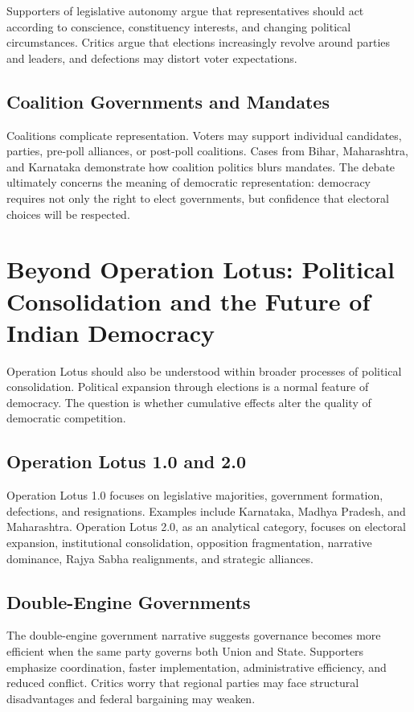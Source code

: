 \documentclass[11pt]{article}
\begin{document}
Supporters of legislative autonomy argue that representatives should act according to conscience, constituency interests, and changing political circumstances. Critics argue that elections increasingly revolve around parties and leaders, and defections may distort voter expectations.

\subsection{Coalition Governments and Mandates}
Coalitions complicate representation. Voters may support individual candidates, parties, pre-poll alliances, or post-poll coalitions. Cases from Bihar, Maharashtra, and Karnataka demonstrate how coalition politics blurs mandates. The debate ultimately concerns the meaning of democratic representation: democracy requires not only the right to elect governments, but confidence that electoral choices will be respected.

\section{Beyond Operation Lotus: Political Consolidation and the Future of Indian Democracy}
Operation Lotus should also be understood within broader processes of political consolidation. Political expansion through elections is a normal feature of democracy. The question is whether cumulative effects alter the quality of democratic competition.

\subsection{Operation Lotus 1.0 and 2.0}
Operation Lotus 1.0 focuses on legislative majorities, government formation, defections, and resignations. Examples include Karnataka, Madhya Pradesh, and Maharashtra. Operation Lotus 2.0, as an analytical category, focuses on electoral expansion, institutional consolidation, opposition fragmentation, narrative dominance, Rajya Sabha realignments, and strategic alliances.

\subsection{Double-Engine Governments}
The double-engine government narrative suggests governance becomes more efficient when the same party governs both Union and State. Supporters emphasize coordination, faster implementation, administrative efficiency, and reduced conflict. Critics worry that regional parties may face structural disadvantages and federal bargaining may weaken.
\end{document}
